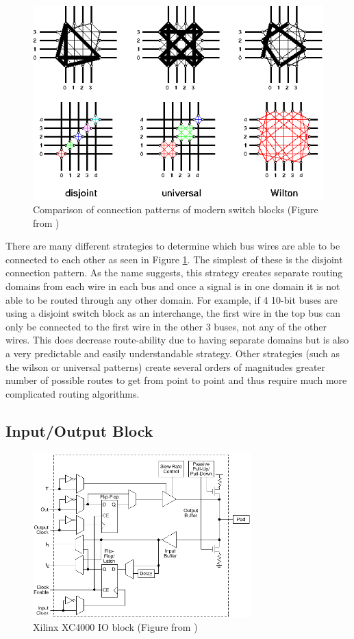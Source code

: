 \documentclass[12pt]{article}
\begin{document}
\begin{figure}[ht]
  \centering
  \includegraphics[width=.6\textwidth]{switch_blocks}
  \caption{Comparison of connection patterns of modern switch blocks (Figure from \cite{switch_blocks})}
  \label{fig:switch_blocks}
\end{figure}

There are many different strategies to determine which bus wires are able to be connected 
to each other as seen in Figure \ref{fig:switch_blocks}. The simplest of these is the disjoint
connection pattern. As the name 
suggests, this strategy creates separate routing domains from each wire in each bus 
and once a signal is in one domain it is not able to be routed through any other 
domain. For example, if 4 10-bit buses are using a disjoint switch block as an interchange,
the first wire in the top bus can only be connected to the first wire in the other 
3 buses, not any of the other wires. This does decrease route-ability due to having 
separate domains but is also a very predictable and easily understandable strategy.
Other strategies (such as the wilson or universal patterns) create several orders 
of magnitudes greater number of possible routes to get from point to point and thus 
require much more complicated routing algorithms.

\subsection{Input/Output Block}

\begin{figure}[ht]
    \centering
    \includegraphics[width=0.75\textwidth]{complex_io}
    \caption{Xilinx XC4000 IO block (Figure from \cite{xilinx_xc4000})}
    \label{fig:complex_io}
\end{figure}
\end{document}
